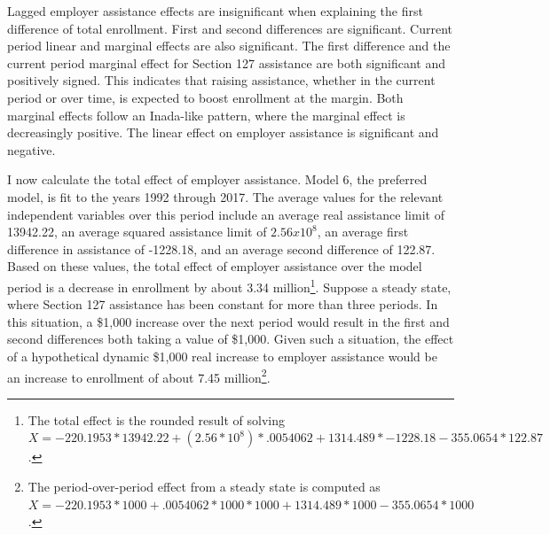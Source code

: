 \documentclass[review]{elsarticle}
\begin{document}
Lagged employer assistance effects are insignificant when explaining the first difference of total enrollment.
First and second differences are significant.
Current period linear and marginal effects are also significant.
The first difference and the current period marginal effect for
Section 127 assistance are both significant and positively signed.
This indicates that raising assistance,
whether in the current period or over time,
is expected to boost enrollment at the margin.
Both marginal effects follow an Inada-like pattern, where the marginal effect is decreasingly positive.
The linear effect on employer assistance is significant and negative.

I now calculate the total effect of employer assistance.
Model 6, the preferred model, is fit to the years 1992 through 2017.
The average values for the relevant independent variables over this period include
an average real assistance limit of 13942.22,
an average squared assistance limit of $2.56x10^8$,
an average first difference in assistance of -1228.18,
and an average second difference of 122.87.
Based on these values, the total effect of employer assistance over the model period is
a decrease in enrollment by about 3.34 million\footnote{
    The total effect is the rounded result of solving $X=-220.1953*13942.22+(2.56*10^8)*.0054062+1314.489*-1228.18-355.0654*122.87$.
}.
Suppose a steady state, where Section 127 assistance has been constant for more than three periods.
In this situation, a \$1,000 increase over the next period would result in
the first and second differences both taking a value of \$1,000.
Given such a situation,
the effect of a hypothetical dynamic \$1,000 real increase to employer assistance would be
an increase to enrollment of about 7.45 million\footnote{
    The period-over-period effect from a steady state is computed as $X=-220.1953*1000+.0054062*1000*1000+1314.489*1000-355.0654*1000$.
}.
\end{document}
